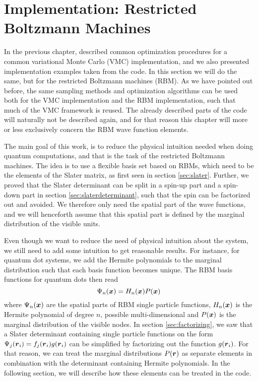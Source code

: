 \chapter{Implementation: Restricted Boltzmann Machines} \label{chp:rbmimplementation}
In the previous chapter, described common optimization procedures for a common variational Monte Carlo (VMC) implementation, and we also presented implementation examples taken from the code. In this section we will do the same, but for the restricted Boltzmann machines (RBM). As we have pointed out before, the same sampling methods and optimization algorithms can be used both for the VMC implementation and the RBM implementation, such that much of the VMC framework is reused. The already described parts of the code will naturally not be described again, and for that reason this chapter will more or less exclusively concern the RBM wave function elements.

The main goal of this work, is to reduce the physical intuition needed when doing quantum computations, and that is the task of the restricted Boltzmann machines. The idea is to use a flexible basis set based on RBMs, which need to be the elements of the Slater matrix, as first seen in section \ref{sec:slater}. Further, we proved that the Slater determinant can be split in a spin-up part and a spin-down part in section \ref{sec:slaterdeterminant}, such that the spin can be factorized out and avoided. We therefore only need the spatial part of the wave functions, and we will henceforth assume that this spatial part is defined by the marginal distribution of the visible units. 

Even though we want to reduce the need of physical intuition about the system, we still need to add some intuition to get reasonable results. For instance, for quantum dot systems, we add the Hermite polynomials to the marginal distribution such that each basis function becomes unique. The RBM basis functions for quantum dots then read
\begin{equation}
\Psi_n(\boldsymbol{{x}})=H_n(\boldsymbol{{x}})P(\boldsymbol{{x}})
\end{equation}
where $\Psi_n(\boldsymbol{{x}})$ are the spatial parts of RBM single particle functions, $H_n(\boldsymbol{{x}})$ is the Hermite polynomial of degree $n$, possible multi-dimensional and $P(\boldsymbol{{x}})$ is the marginal distribution of the visible nodes. In section \ref{sec:factorizing}, we saw that a Slater determinant containing single particle functions on the form $\Psi_j(\boldsymbol{{r}}_i)=f_j(\boldsymbol{{r}}_i)g(\boldsymbol{{r}}_i)$ can be simplified by factorizing out the function $g(\boldsymbol{{r}}_i)$. For that reason, we can treat the marginal distributions $P(\boldsymbol{{r}})$ as separate elements in combination with the determinant containing Hermite polynomials. In the following section, we will describe how these elements can be treated in the code. 

